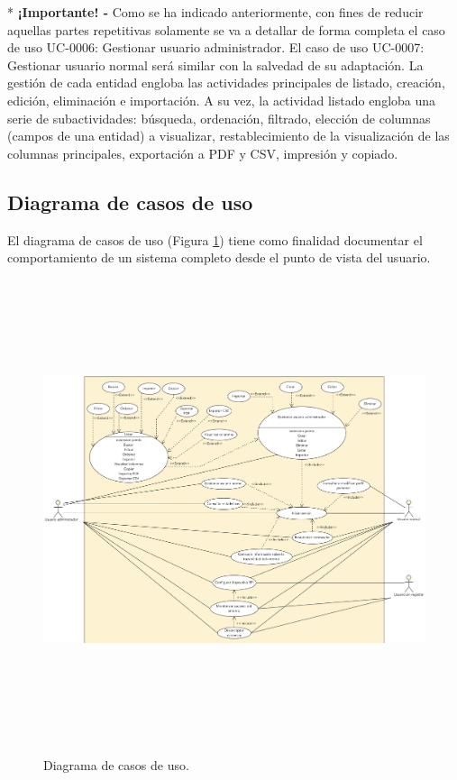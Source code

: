 \documentclass[12pt,a4paper, twoside]{report}
\begin{document}
	{\color{black!40!blue}*} \textbf{¡Importante! -} Como se ha indicado anteriormente, con fines de reducir aquellas partes repetitivas solamente se va a detallar de forma completa el caso de uso UC-0006: Gestionar usuario administrador. El caso de uso UC-0007: Gestionar usuario normal será similar con la salvedad de su adaptación. La gestión de cada entidad engloba las actividades principales de listado, creación, edición, eliminación e importación. A su vez, la actividad listado engloba una serie de subactividades: búsqueda, ordenación, filtrado, elección de columnas (campos de una entidad) a visualizar, restablecimiento de la visualización de las columnas principales, exportación a PDF y CSV, impresión y copiado.

	\subsection{Diagrama de casos de uso}
	
	El diagrama de casos de uso (Figura \ref{fig:use_case}) tiene como finalidad documentar el comportamiento de un sistema completo desde el punto de vista del usuario.
	
	\begin{figure}[!ht]   
		\caption{Diagrama de casos de uso.} 
		\begin{center} 
	 		\includegraphics[width=18cm,height=13.5cm]{Images/analysis/useCases} \\
			\label{fig:use_case} 
		\end{center}  
	\end{figure} 	
	
\end{document}
